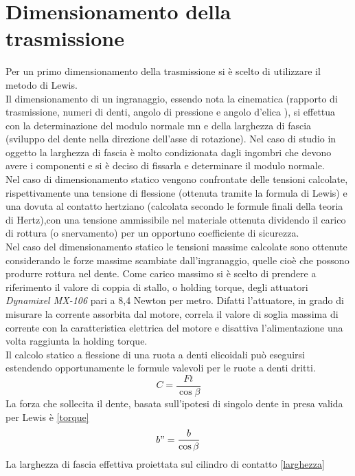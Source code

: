 \documentclass[%
corpo=11pt,
twoside,
 stile=classica,
oldstyle,
greek,%
]{toptesi}
\begin{document}
	\section{Dimensionamento della trasmissione}
	Per un primo dimensionamento della trasmissione si è scelto di utilizzare il metodo di Lewis. \\
	Il dimensionamento di un ingranaggio, essendo nota la cinematica (rapporto di trasmissione, numeri di denti, angolo di pressione 
	 e angolo d’elica ), si effettua con la determinazione del modulo normale mn e della larghezza di fascia (sviluppo del dente nella
	direzione dell’asse di rotazione). Nel caso di studio in oggetto la larghezza di fascia è molto condizionata dagli ingombri che devono avere i componenti e si è deciso di fissarla e determinare il modulo normale. \\
	Nel caso di dimensionamento statico vengono confrontate delle tensioni calcolate, rispettivamente una tensione di flessione (ottenuta tramite la formula di Lewis) e una dovuta al contatto hertziano (calcolata secondo le formule finali della teoria di Hertz),con una tensione ammissibile nel materiale ottenuta dividendo il carico di rottura (o
	snervamento) per un opportuno coefficiente di sicurezza. \\
	Nel caso del dimensionamento statico le tensioni massime calcolate sono ottenute considerando le forze massime scambiate dall’ingranaggio, quelle cioè che possono produrre rottura nel dente.
	Come carico massimo si è scelto di prendere a riferimento il valore di coppia di stallo, o holding torque, degli attuatori \textit{Dynamixel MX-106} pari a 8,4 Newton per metro. Difatti l'attuatore, in grado di misurare la corrente assorbita dal motore, correla il valore di soglia massima di corrente con la caratteristica elettrica del motore e disattiva l'alimentazione una volta raggiunta la holding torque. \\
	Il calcolo statico a flessione di una ruota a denti elicoidali può eseguirsi estendendo opportunamente le formule valevoli per le ruote a denti dritti.
	\begin{equation}\label{torque}
	C=\frac{Ft}{\cos\beta}
	\end{equation}
	La forza che sollecita il dente, basata sull'ipotesi di singolo dente in presa valida per Lewis è \ref{torque}
	\begin{equation}\label{larghezza}
	b"=\frac{b}{\cos\beta}
	\end{equation}	
	La larghezza di fascia effettiva proiettata sul cilindro di contatto \ref{larghezza}
\end{document}
